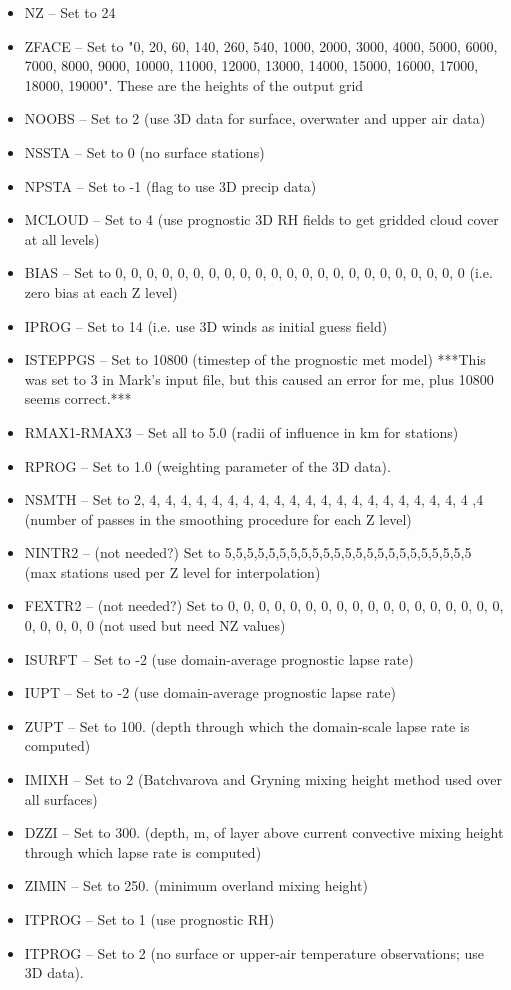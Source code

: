 \documentclass[10pt,a4paper]{article}
\begin{document}
\begin{itemize}
\begin{itemize}
\item NZ -- Set to 24
\item ZFACE -- Set to "0, 20, 60, 140, 260, 540, 1000, 2000, 3000, 4000, 5000, 6000, 7000, 8000, 9000, 10000, 11000, 12000, 13000, 14000, 15000, 16000, 17000, 18000, 19000". These are the heights of the output grid
\item NOOBS -- Set to 2 (use 3D data for surface, overwater and upper air data)
\item NSSTA -- Set to 0 (no surface stations)
\item NPSTA -- Set to -1 (flag to use 3D precip data)
\item MCLOUD -- Set to 4 (use prognostic 3D RH fields to get gridded cloud cover at all levels)
\item BIAS -- Set to 0, 0, 0, 0, 0, 0, 0, 0, 0, 0, 0, 0, 0, 0, 0, 0, 0, 0, 0, 0, 0, 0, 0 (i.e. zero bias at each Z level)
\item IPROG -- Set to 14 (i.e. use 3D winds as initial guess field)
\item ISTEPPGS -- Set to 10800 (timestep of the prognostic met model) ***This was set to 3 in Mark's input file, but this caused an error for me, plus 10800 seems correct.***
\item RMAX1-RMAX3 -- Set all to 5.0 (radii of influence in km for stations)
\item RPROG -- Set to 1.0 (weighting parameter of the 3D data).
\item NSMTH -- Set to 2, 4, 4, 4, 4, 4, 4, 4, 4, 4, 4, 4, 4, 4, 4, 4, 4, 4, 4, 4, 4, 4 ,4 (number of passes in the smoothing procedure for each Z level)
\item NINTR2 -- (not needed?) Set to 5,5,5,5,5,5,5,5,5,5,5,5,5,5,5,5,5,5,5,5,5,5,5 (max stations used per Z level for interpolation)
\item FEXTR2 -- (not needed?) Set to 0, 0, 0, 0, 0, 0, 0, 0, 0, 0, 0, 0, 0, 0, 0, 0, 0, 0, 0, 0, 0, 0, 0 (not used but need NZ values)
\item ISURFT -- Set to -2 (use domain-average prognostic lapse rate)
\item IUPT -- Set to -2 (use domain-average prognostic lapse rate)
\item ZUPT -- Set to 100. (depth through which the domain-scale lapse rate is computed)
\item IMIXH -- Set to 2 (Batchvarova and Gryning mixing height method used over all surfaces)
\item DZZI -- Set to 300. (depth, m, of layer above current convective mixing height through which lapse rate is computed)
\item ZIMIN -- Set to 250. (minimum overland mixing height)
\item ITPROG -- Set to 1 (use prognostic RH)
\item ITPROG -- Set to 2 (no surface or upper-air temperature observations; use 3D data).
\end{itemize}
\end{itemize}
\end{document}
